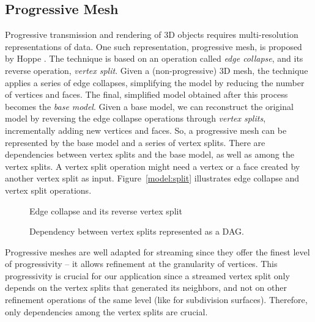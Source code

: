 \subsection{Progressive Mesh}
\label{s:model:mesh}

    Progressive transmission and rendering of 3D objects
    requires multi-resolution representations of data. One such 
    representation, progressive mesh, is proposed by Hoppe
    \cite{hoppe96progressive}.
    The technique is based on an
    operation called \textit{edge collapse}, and its reverse
    operation, \textit{vertex split}.  Given a (non-progressive)
    3D mesh, the technique applies a series of edge collapses,
    simplifying the model by reducing the number of vertices and
    faces.  The final, simplified model obtained after this
    process becomes the \textit{base model}.  Given a base model,
    we can reconstruct the original model by reversing
    the edge collapse operations through \textit{vertex splits},
    incrementally adding new vertices and faces. So, a
    progressive mesh can be represented by the base
    model and a series of vertex splits.  There are
    dependencies between vertex splits and the base model, as well as
    among the vertex splits.  A vertex split
    operation might need a vertex or a face created by another
    vertex split as input.  Figure~\ref{model:split} illustrates edge
    collapse and vertex split operations.

    \begin{figure}
    \begin{minipage}[b]{0.5\linewidth}
    \centering
    \caption{Edge collapse and its reverse vertex split\label{model:split}}
    \end{minipage}
    \hspace{0.2cm}
    \begin{minipage}[b]{0.5\linewidth}
    \centering
    \caption{Dependency between vertex splits represented as a DAG.\label{model:dag2}}
    \end{minipage}
    \end{figure}

  Progressive meshes are well adapted for streaming since
  they offer the finest level of progressivity --
  it allows refinement at the granularity of vertices. 
  This progressivity is crucial for our
  application since a streamed vertex split only depends on
  the vertex splits that generated its neighbors, and not on other
  refinement operations of the same level (like for
  subdivision surfaces). Therefore, only dependencies among
  the vertex splits are crucial.

